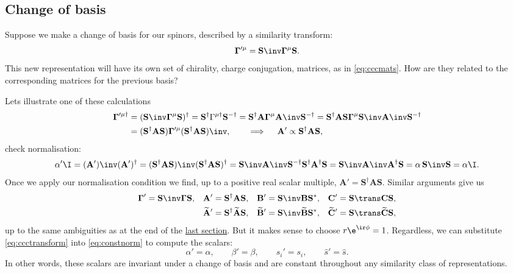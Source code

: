 \documentclass[11pt]{article}
\newcommand{\invd}{^{-\dag}}
\newcommand{\cc}{^\ast}
\newcommand{\hc}{^\dag}
\newcommand{\Gammab}{\boldsymbol{\Gamma}}
\newcommand{\mud}{{\mu\dag}}
\renewcommand{\S}{\mathbf{S}}
\newcommand{\A}{\mathbf{A}}
\newcommand{\B}{\mathbf{B}}
\renewcommand{\C}{\mathbf{C}}
\newcommand{\At}{\widetilde{\A}}
\newcommand{\Bt}{\widetilde{\B}}
\newcommand{\Ct}{\widetilde{\C}}
\newcommand{\sh}{\hat{s}}
\begin{document}

\subsection{Change of basis}\label{sec:basis}

Suppose we make a change of basis for our spinors, described by a similarity transform:
%
\begin{equation*}
  \Gammab'^{\mu} = \S\inv \Gammab^\mu \S.
\end{equation*}
%
This new representation will have its own set of chirality, charge conjugation, \etc matrices, as in \cref{eq:cccmats}.
How are they related to the corresponding matrices for the previous basis?

Lets illustrate one of these calculations
%
\begin{align*}
  \Gammab'^\mud
    &= (\S\inv \Gammab^\mu \S)\hc
    = \S\hc \Gamma^\mud \S\invd
    = \S\hc \A \Gammab^\mu \A\inv \S\invd
    = \S\hc \A \S \Gammab^\mu \S\inv \A\inv \S\invd \\
    &= (\S\hc \A \S) \Gammab'^\mu (\S\hc \A \S)\inv,
    \qquad \implies \quad
    \A' \propto \S\hc \A \S,
\end{align*}
%
check normalisation:
%
\begin{equation*}
  \alpha' \I
    = (\A')\inv (\A')\hc 
    = (\S\hc \A \S)\inv (\S\hc \A \S)\hc 
    = \S\inv \A\inv \S\invd \S\hc \A\hc \S 
    = \S\inv \A\inv \A\hc \S 
    = \alpha\, \S\inv \S 
    = \alpha \I.
\end{equation*}
%
Once we apply our normalisation condition we find, up to a positive real scalar multiple,
\( \A' = \S\hc \A \S \).
Similar arguments give us
%
\begin{equation}\label{eq:ccctransform}
\begin{aligned}
  \Gammab' &= \S\inv \Gammab \S, &
  \A' &= \S\hc \A \S, &
  \B' &= \S\inv \B \S\cc, &
  \C' &= \S\trans \C \S,
\\ &&
  \At' &= \S\hc \At \S, &
  \Bt' &= \S\inv \Bt \S\cc, &
  \Ct' &= \S\trans \Ct \S,
\end{aligned}
\end{equation}
%
up to the same ambiguities as at the end of the \hyperref[eq:constnorm]{last section}.
But it makes sense to choose \( r \e^{\ir\phi} = 1 \).
Regardless, we can substitute \cref{eq:ccctransform} into \cref{eq:constnorm} to compute the scalars:
%
\begin{equation*}
  \alpha' = \alpha, \qquad
  \beta' = \beta, \qquad
  s_i' = s_i, \qquad
  \sh' = \sh.
\end{equation*}
%
In other words, these scalars are invariant under a change of basis and are constant throughout any similarity class of representations.
\end{document}
